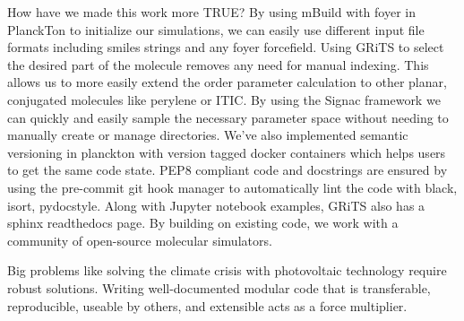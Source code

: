 How have we made this work more TRUE?
By using  mBuild with foyer in PlanckTon to initialize our simulations, we can easily use different input file formats including smiles strings and any foyer forcefield. 
Using GRiTS to select the desired part of the molecule removes any need for manual indexing. This allows us to more easily extend the order parameter calculation to other planar, conjugated molecules like perylene or ITIC.
By using the Signac framework we can quickly and easily sample the necessary parameter space without needing to manually create or manage directories. 
We've also implemented semantic versioning in planckton with version tagged docker containers which helps users to get the same code state.
PEP8 compliant code and docstrings are ensured by using the pre-commit git hook manager to automatically lint the code with black, isort, pydocstyle.
Along with Jupyter notebook examples, GRiTS also has a sphinx readthedocs page.
By building on existing code, we work with a community of open-source molecular simulators. 

%
Big problems like solving the climate crisis with photovoltaic technology require robust solutions. 
Writing well-documented modular code that is transferable, reproducible, useable by others, and extensible acts as a force multiplier.


